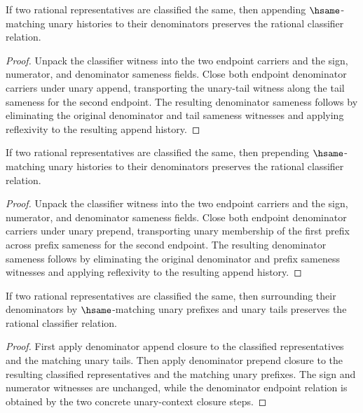 \begin{theorem}
\label{thm:rat-classifier-append-unary-denominators-closed}
If two rational representatives are classified the same, then appending
\(\hsame\)-matching unary histories to their denominators preserves the
rational classifier relation.
\end{theorem}
\begin{proof}
Unpack the classifier witness into the two endpoint carriers and the sign,
numerator, and denominator sameness fields. Close both endpoint denominator
carriers under unary append, transporting the unary-tail witness along the
tail sameness for the second endpoint. The resulting denominator sameness follows by
eliminating the original denominator and tail sameness witnesses and applying
reflexivity to the resulting append history.
\end{proof}

\begin{theorem}
\label{thm:rat-classifier-prepend-unary-denominators-closed}
If two rational representatives are classified the same, then prepending
\(\hsame\)-matching unary histories to their denominators preserves the
rational classifier relation.
\end{theorem}
\begin{proof}
Unpack the classifier witness into the two endpoint carriers and the sign,
numerator, and denominator sameness fields. Close both endpoint denominator
carriers under unary prepend, transporting unary membership of the first prefix
across prefix sameness for the second endpoint. The resulting denominator
sameness follows by eliminating the original denominator and prefix sameness
witnesses and applying reflexivity to the resulting append history.
\end{proof}

\begin{theorem}
\label{thm:rat-classifier-append-unary-denominator-context-closed}
If two rational representatives are classified the same, then surrounding their
denominators by $\hsame$-matching unary prefixes and unary tails preserves the
rational classifier relation.
\end{theorem}
\begin{proof}
First apply denominator append closure to the classified representatives and
the matching unary tails. Then apply denominator prepend closure to the
resulting classified representatives and the matching unary prefixes. The sign
and numerator witnesses are unchanged, while the denominator endpoint relation
is obtained by the two concrete unary-context closure steps.
\end{proof}

